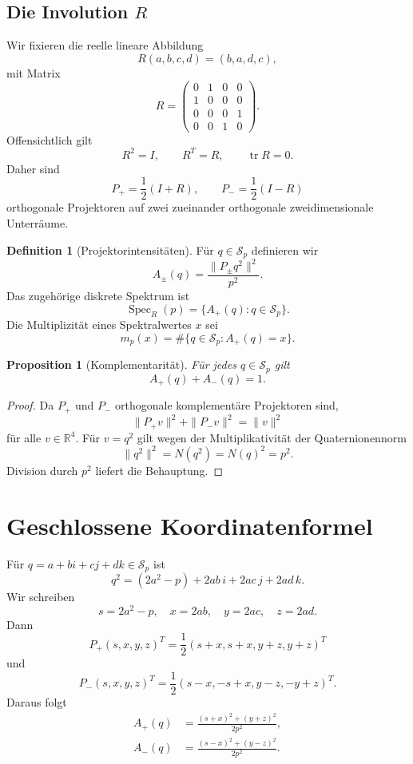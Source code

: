 \documentclass[11pt,a4paper]{article}
\newtheorem{proposition}[satz]{Proposition}
\theoremstyle{definition}
\newtheorem{definition}[satz]{Definition}
\newcommand{\RR}{\mathbb R}
\newcommand{\Spec}{\operatorname{Spec}}
\newcommand{\tr}{\operatorname{tr}}
\begin{document}
\subsection{Die Involution $R$}
Wir fixieren die reelle lineare Abbildung
\begin{equation}\label{eq:R}
R(a,b,c,d)=(b,a,d,c),
\end{equation}
mit Matrix
\[
R=
\begin{pmatrix}
0&1&0&0\\
1&0&0&0\\
0&0&0&1\\
0&0&1&0
\end{pmatrix}.
\]
Offensichtlich gilt
\[
R^2=I,
\qquad
R^T=R,
\qquad
\tr R=0.
\]
Daher sind
\begin{equation}\label{eq:projectors}
P_+=\frac12(I+R),
\qquad
P_-=\frac12(I-R)
\end{equation}
orthogonale Projektoren auf zwei zueinander orthogonale zweidimensionale Unterräume.

\begin{definition}[Projektorintensitäten]
Für $q\in\mathcal S_p$ definieren wir
\begin{equation}\label{eq:Adef}
A_\pm(q)=\frac{\|P_\pm q^2\|^2}{p^2}.
\end{equation}
Das zugehörige diskrete Spektrum ist
\[
\Spec_R(p)=\{A_+(q):q\in\mathcal S_p\}.
\]
Die Multiplizität eines Spektralwertes $x$ sei
\[
m_p(x)=\#\{q\in\mathcal S_p:A_+(q)=x\}.
\]
\end{definition}

\begin{proposition}[Komplementarität]\label{prop:complement}
Für jedes $q\in\mathcal S_p$ gilt
\[
A_+(q)+A_-(q)=1.
\]
\end{proposition}
\begin{proof}
Da $P_+$ und $P_-$ orthogonale komplementäre Projektoren sind,
\[
\|P_+v\|^2+\|P_-v\|^2=\|v\|^2
\]
für alle $v\in\RR^4$. Für $v=q^2$ gilt wegen der Multiplikativität der Quaternionennorm
\[
\|q^2\|^2=N(q^2)=N(q)^2=p^2.
\]
Division durch $p^2$ liefert die Behauptung.
\end{proof}

\section{Geschlossene Koordinatenformel}
Für $q=a+bi+cj+dk\in\mathcal S_p$ ist
\begin{equation}\label{eq:q2}
q^2=(2a^2-p)+2ab\,i+2ac\,j+2ad\,k.
\end{equation}
Wir schreiben
\[
s=2a^2-p,
\quad x=2ab,
\quad y=2ac,
\quad z=2ad.
\]
Dann
\[
P_+(s,x,y,z)^T
=\frac12(s+x,s+x,y+z,y+z)^T
\]
und
\[
P_-(s,x,y,z)^T
=\frac12(s-x,-s+x,y-z,-y+z)^T.
\]
Daraus folgt
\begin{align}
A_+(q)&=\frac{(s+x)^2+(y+z)^2}{2p^2},\label{eq:Aplus}\\
A_-(q)&=\frac{(s-x)^2+(y-z)^2}{2p^2}.\label{eq:Aminus}
\end{align}
\end{document}
